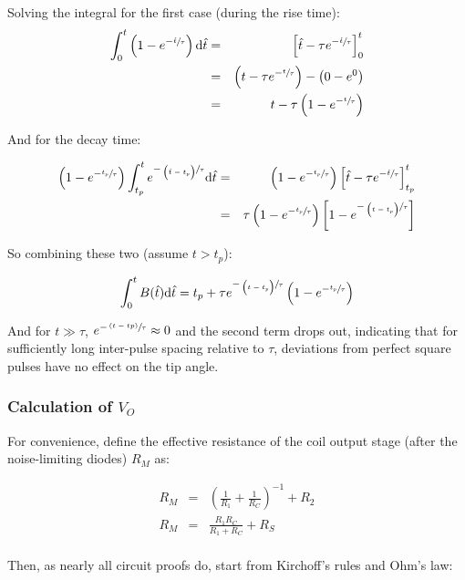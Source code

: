\documentclass[../PaulGanssle-Thesis.tex]{subfiles}
\begin{document}
Solving the integral for the first case (during the rise time):
\begin{eqnarray}
\int_0^t\left(1-e^{-\sfrac{\hat{t}}{\tau}}\right)\mathrm{d}\hat{t} & = & \left[\hat{t} - \tau e^{-\sfrac{\hat{t}}{\tau}}\right]^{t}_{0} \\
& = & \left(t-\tau e^{-\sfrac{t}{\tau}}\right) - \left(0 - e^{0}\right)\\
& = & t - \tau\left(1 -e^{-\sfrac{t}{\tau}}\right)
\end{eqnarray}

And for the decay time:

\begin{eqnarray}
\left(1-e^{-\sfrac{t_p}{\tau}}\right)\int_{t_p}^{t}e^{-\sfrac{\left(\hat{t}-t_p\right)}{\tau}}\mathrm{d} \hat{t} & = & \left(1-e^{-\sfrac{t_p}{\tau}}\right)\left[\hat{t}-\tau e^{-\sfrac{\hat{t}}{\tau}}\right]^{t}_{t_{p}} \\
& = & \tau\left(1-e^{-\sfrac{t_{p}}{\tau}}\right)\left[1-e^{-\sfrac{\left(t-t_p\right)}{\tau}}\right]
\end{eqnarray}

So combining these two (assume $t > t_p$):

\begin{equation}
\int_{0}^{t} B(\hat{t})\mathrm{d}\hat{t} = t_p + \tau e^{-\sfrac{\left(t-t_p\right)}{\tau}}\left(1 - e^{-\sfrac{t_p}{\tau}}\right)
\end{equation}

And for $t \gg \tau$, $e^{-\sfrac{\left(t-tp\right)}{\tau}} \approx 0$ and the second term drops out, indicating that for sufficiently long inter-pulse spacing relative to $\tau$, deviations from perfect square pulses have no effect on the tip angle.

\subsubsection{Calculation of $V_O$}
For convenience, define the effective resistance of the coil output stage (after the noise-limiting diodes) $R_M$ as:

\begin{eqnarray}
R_M & = & \left(\frac{1}{R_1} + \frac{1}{R_C}\right)^{-1} + R_2 \\
R_M & = & \frac{R_1R_C}{R_1 + R_C} + R_S \\ \label{eqn:RM_EffectiveResistance}
\end{eqnarray}

Then, as nearly all circuit proofs do, start from Kirchoff's rules and Ohm's law:
\end{document}
